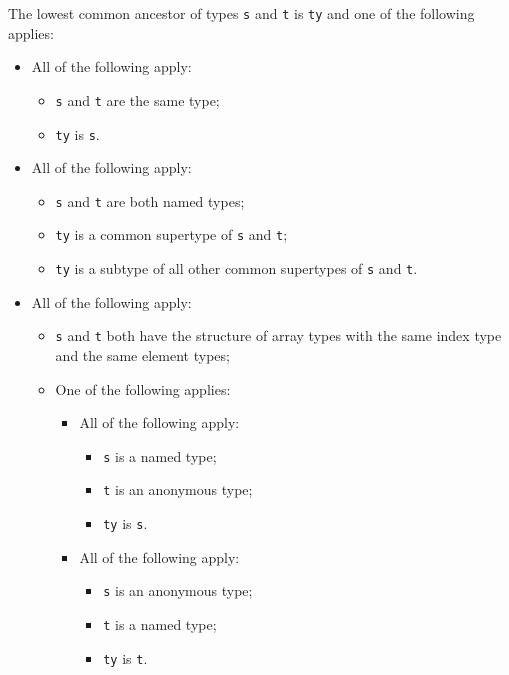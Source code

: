 \documentclass{book}
\begin{document}
  The lowest common ancestor of types \texttt{s} and \texttt{t} is \texttt{ty} and one of the following applies:
  \begin{itemize}
  \item All of the following apply:
    \begin{itemize}
    \item \texttt{s} and \texttt{t} are the same type;
    \item \texttt{ty} is \texttt{s}.
    \end{itemize}

  \item All of the following apply:
    \begin{itemize}
    \item \texttt{s} and \texttt{t} are both named types;
    \item \texttt{ty} is a common supertype of \texttt{s} and \texttt{t};
    \item \texttt{ty} is a subtype of all other common supertypes of \texttt{s} and \texttt{t}.
    \end{itemize}

  \item All of the following apply:
    \begin{itemize}
    \item \texttt{s} and \texttt{t} both have the structure of array types with the same index type
      and the same element types;

    \item One of the following applies:
      \begin{itemize}
      \item All of the following apply:
        \begin{itemize}
        \item \texttt{s} is a named type;
        \item \texttt{t} is an anonymous type;
        \item \texttt{ty} is \texttt{s}.
        \end{itemize}

      \item All of the following apply:
        \begin{itemize}
        \item \texttt{s} is an anonymous type;
        \item \texttt{t} is a named type;
        \item \texttt{ty} is \texttt{t}.
        \end{itemize}
      \end{itemize}
    \end{itemize}


\end{itemize}
\end{document}
